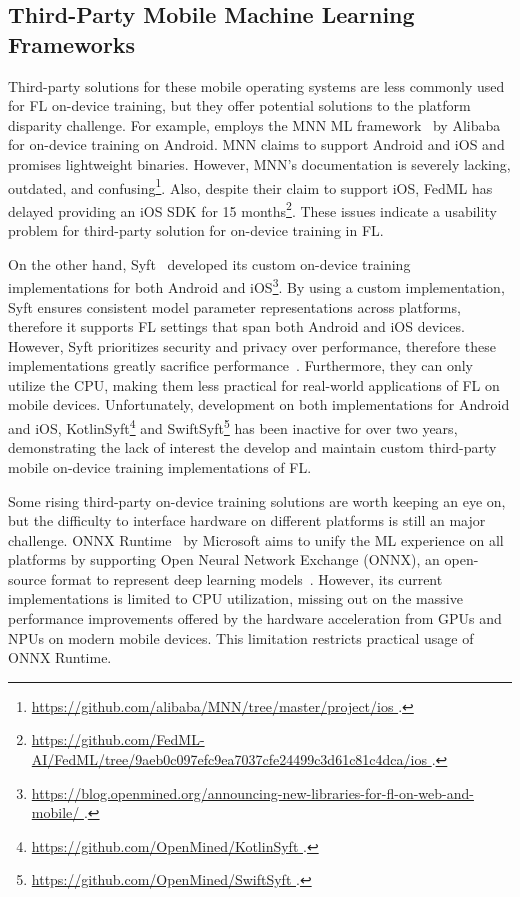\documentclass[conference]{IEEEtran}
\begin{document}
\subsection{Third-Party Mobile Machine Learning Frameworks}

Third-party solutions for these mobile operating systems are less commonly used
for FL on-device training,
but they offer potential solutions to the platform disparity challenge.
For example, \FedML{} employs
the MNN ML framework~\cite{jiang2020mnn,lv2022walle} by Alibaba for
on-device training on Android.
MNN claims to support Android and iOS and promises lightweight binaries.
However, MNN's documentation is
severely lacking, outdated, and confusing\footnote{\url{
    https://github.com/alibaba/MNN/tree/master/project/ios
}.}.
Also, despite their claim to support iOS,
FedML has delayed providing an iOS SDK for 15 months\footnote{\url{
    https://github.com/FedML-AI/FedML/tree/9aeb0c097efc9ea7037cfe24499c3d61c81c4dca/ios
}.}.
These issues indicate a usability problem for third-party solution for
on-device training in FL.

On the other hand,
Syft~\cite{ryffel2018generic,Ziller2021,hall2021syft} developed
its custom on-device training implementations for
both Android and iOS\footnote{\url{
    https://blog.openmined.org/announcing-new-libraries-for-fl-on-web-and-mobile/
}.}.
By using a custom implementation,
Syft ensures consistent model parameter representations across platforms,
therefore it supports FL settings that span both Android and iOS devices.
However, Syft prioritizes security and privacy over performance,
therefore these implementations greatly sacrifice
performance~\cite{ryffel2018generic}.
Furthermore, they can only utilize the CPU,
making them less practical for real-world applications of
FL on mobile devices.
Unfortunately, development on
both implementations for Android and iOS,
KotlinSyft\footnote{\url{
    https://github.com/OpenMined/KotlinSyft
}.} and SwiftSyft\footnote{\url{
    https://github.com/OpenMined/SwiftSyft
}.} has been inactive for over two years,
demonstrating the lack of interest the develop and maintain
custom third-party mobile on-device training implementations of FL.

Some rising third-party on-device training solutions are worth keeping an eye on,
but the difficulty to interface hardware on different platforms is
still an major challenge.
ONNX Runtime~\cite{onnxruntime} by Microsoft aims to
unify the ML experience on all platforms by
supporting Open Neural Network Exchange (ONNX),
an open-source format to represent deep learning
models~\cite{ParedesdelRio2020}.
However, its current implementations is limited to CPU utilization,
missing out on the massive performance improvements offered by
the hardware acceleration
from GPUs and NPUs on modern mobile devices.
This limitation restricts practical usage of ONNX Runtime.
\end{document}
